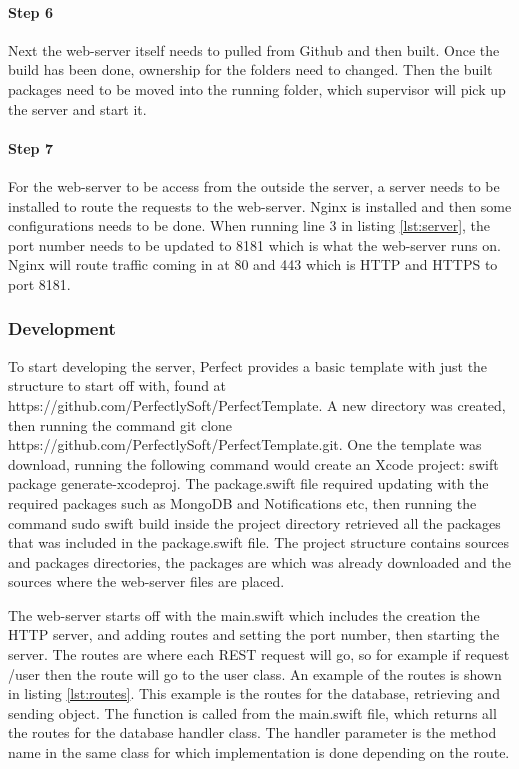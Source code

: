 \paragraph{Step 6}
Next the web-server itself needs to pulled from Github and then built. Once the build has been done, ownership for the folders need to changed. Then the built packages need to be moved into the running folder, which supervisor will pick up the server and start it.


\paragraph{Step 7}
For the web-server to be access from the outside the server, a server needs to be installed to route the requests to the web-server. Nginx is installed and then some configurations needs to be done. When running line 3 in listing \ref{lst:server}, the port number needs to be updated to 8181 which is what the web-server runs on. Nginx will route traffic coming in at 80 and 443 which is HTTP and HTTPS to port 8181.


\subsubsection{Development}

To start developing the server, Perfect provides a basic template with just the structure to start off with, found at https://github.com/PerfectlySoft/PerfectTemplate. A new directory was created, then running the command git clone https://github.com/PerfectlySoft/PerfectTemplate.git. One the template was download, running the following command would create an Xcode project: swift package generate-xcodeproj. The package.swift file required updating with the required packages such as MongoDB and Notifications etc, then running the command sudo swift build inside the project directory retrieved all the packages that was included in the package.swift file. The project structure contains sources and packages directories, the packages are which was already downloaded and the sources where the web-server files are placed. 

The web-server starts off with the main.swift which includes the creation the HTTP server, and adding routes and setting the port number, then starting the server. The routes are where each REST request will go, so for example if request /user then the route will go to the user class. An example of the routes is shown in listing \ref{lst:routes}. This example is the routes for the database, retrieving and sending object. The function is called from the main.swift file, which returns all the routes for the database handler class. The handler parameter is the method name in the same class for which implementation is done depending on the route.


